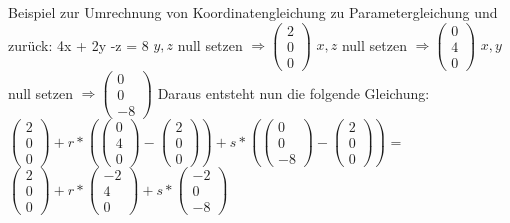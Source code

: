 \documentclass[11pt,a4paper,onecolumn]{scrartcl}
\begin{document}
\begin{flushleft}
Beispiel zur Umrechnung von Koordinatengleichung zu Parametergleichung und zurück: \linebreak
4x + 2y -z = 8 \linebreak
$y, z$ null setzen $\Rightarrow (\begin{smallmatrix} 2 \\ 0 \\ 0 \end{smallmatrix})$ \linebreak
$x, z$ null setzen $\Rightarrow (\begin{smallmatrix} 0 \\ 4 \\ 0 \end{smallmatrix})$ \linebreak 
$x, y$ null setzen $\Rightarrow (\begin{smallmatrix} 0 \\ 0 \\ -8 \end{smallmatrix})$ \linebreak 
Daraus entsteht nun die folgende Gleichung: \linebreak
$(\begin{smallmatrix} 2 \\ 0 \\ 0 \end{smallmatrix}) + r *((\begin{smallmatrix} 0 \\ 4 \\ 0 \end{smallmatrix}) - (\begin{smallmatrix} 2 \\ 0 \\ 0 \end{smallmatrix})) + s * ((\begin{smallmatrix} 0 \\ 0 \\ -8 \end{smallmatrix}) - (\begin{smallmatrix} 2 \\ 0 \\ 0 \end{smallmatrix}))$  = \linebreak
$(\begin{smallmatrix} 2 \\ 0 \\ 0 \end{smallmatrix}) + r *(\begin{smallmatrix} -2 \\ 4 \\ 0 \end{smallmatrix}) + s * (\begin{smallmatrix} -2 \\ 0 \\ -8 \end{smallmatrix})$

\end{flushleft}
\end{document}
